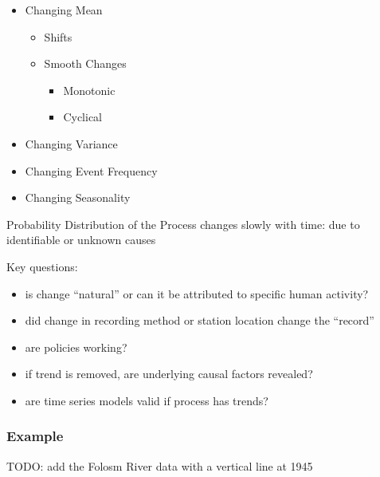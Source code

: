 \documentclass[
  letterpaper,
  DIV=11,
  numbers=noendperiod]{scrreprt}
\providecommand{\tightlist}{%
  \setlength{\itemsep}{0pt}\setlength{\parskip}{0pt}}
\begin{document}
\begin{itemize}
\tightlist
\item
  Changing Mean

  \begin{itemize}
  \tightlist
  \item
    Shifts
  \item
    Smooth Changes

    \begin{itemize}
    \tightlist
    \item
      Monotonic
    \item
      Cyclical
    \end{itemize}
  \end{itemize}
\item
  Changing Variance
\item
  Changing Event Frequency
\item
  Changing Seasonality
\end{itemize}

Probability Distribution of the Process changes slowly with time: due to
identifiable or unknown causes

Key questions:

\begin{itemize}
\tightlist
\item
  is change ``natural'' or can it be attributed to specific human
  activity?
\item
  did change in recording method or station location change the
  ``record''
\item
  are policies working?
\item
  if trend is removed, are underlying causal factors revealed?
\item
  are time series models valid if process has trends?
\end{itemize}

\subsubsection{Example}\label{example}

TODO: add the Folosm River data with a vertical line at 1945
\end{document}
